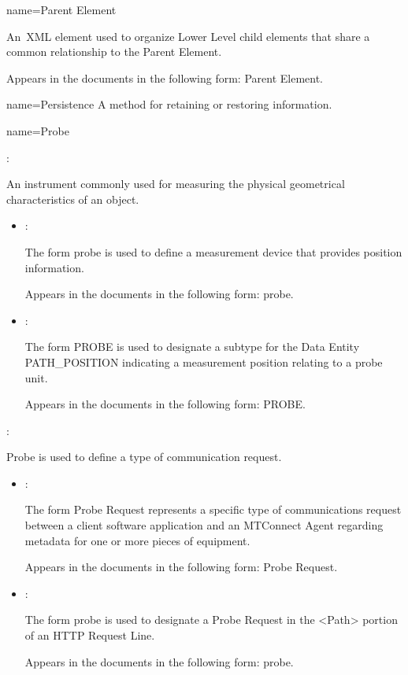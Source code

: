 {
  name={Parent Element}
}
{
	An XML element used to organize Lower Level child elements that share a common relationship to the Parent Element.

	Appears in the documents in the following form: Parent Element.
}


{
  name={Persistence}
}
{
	A method for retaining or restoring information.
}


{
  name={Probe}
}
{
	:

	An instrument commonly used for measuring the physical geometrical characteristics of an object.

    \begin{itemize}
	\item {}:

	The form probe is used to define a measurement device that provides position information.

	Appears in the documents in the following form: probe. 

	\item {}:

	The form PROBE is used to designate a subtype for the Data Entity PATH\_POSITION indicating a measurement position relating to a probe unit.

	Appears in the documents in the following form: PROBE.
    \end{itemize}

	:

	Probe is used to define a type of communication request. 

    \begin{itemize}
	\item {}:

	The form Probe Request represents a specific type of communications request between a client software application and an MTConnect Agent regarding metadata for one or more pieces of equipment.

	Appears in the documents in the following form: Probe Request.

	\item {}:

	The form probe is used to designate a Probe Request in the <Path> portion of an HTTP Request Line.

	Appears in the documents in the following form: probe.
    \end{itemize}
}


